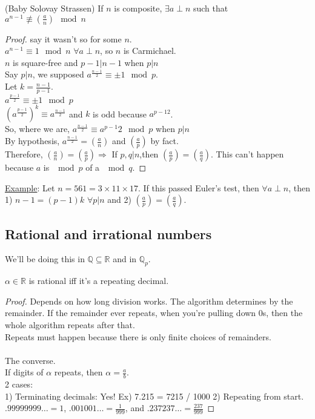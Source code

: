    \begin{theorem}(Baby Solovay Strassen)
    If $n$ is composite, $\exists a \perp n$ such that $a^{{n-1}} 
    \not\equiv (\frac{a}{n}) \mod n$
   \end{theorem}
   \begin{proof}
    say it wasn't so for some $n$.\\
    $a^{n-1} \equiv 1 \mod n$ $\forall a \perp n$, so $n$ is Carmichael.\\
    $n$ is square-free and $p-1 | n-1$ when $p | n$\\
    Say $p | n$, we supposed $a^{\frac{n-1}{2}} \equiv \pm 1 \mod p$.\\
    Let $k = \frac{n-1}{p-1}$.\\
    $a^{\frac{p-1}{2}} \equiv \pm 1 \mod p$\\
    $(a^{\frac{p-1}{2}})^k \equiv a^{\frac{n-1}{2}}$ and $k$ is odd because
    $a^{{p-1}{2}}$.\\
    So, where we are, $a^{\frac{n-1}{2}} \equiv a^{p-1}{2} \mod p$ when $p |n$\\
    By hypothesis, $a^{\frac{n-1}{2}} = (\frac{a}{n})$ and $(\frac{a}{p})$
    by fact.\\
    Therefore, $(\frac{a}{n}) = (\frac{a}{p}) \Rightarrow$ If $p,q | n$,then
    $(\frac{a}{p}) = (\frac{a}{q})$. This can't happen because $a$ is $\mod p$
    of a $\mod q$.
   \end{proof}
   \underline{Example}: Let $n = 561 = 3 \times 11 \times 17$. If this passed
    Euler's test, then $\forall a \perp n$, then 1) $n-1 = (p-1)k$ $\forall
    p | n$ and 2) $(\frac{a}{p}) = (\frac{a}{q})$.

  \subsection*{Rational and irrational numbers}
    We'll be doing this in $\mathbb{Q} \subseteq \mathbb{R}$ and in 
    $\mathbb{Q}_p$.\\
    \begin{theorem}
      $\alpha \in \mathbb{R}$ is rational iff it's a repeating decimal.
    \end{theorem}
    \begin{proof}
      Depends on how long division works. The algorithm determines by the
      remainder. If the remainder ever repeats, when you're pulling down 0s, 
      then the whole algorithm repeats after that.\\
      Repeats must happen because there is only finite choices of remainders.
      \\\\
      The converse.\\
      If digits of $\alpha$ repeats, then $\alpha = \frac{a}{b}$.\\
      2 cases:\\
      1) Terminating decimals: Yes! Ex) 7.215 = 7215 / 1000
      2) Repeating from start. $.99999999\ldots = 1$, $.001001 \ldots = 
      \frac{1}{999}$, and $.237237\ldots = \frac{237}{999}$
    \end{proof}
